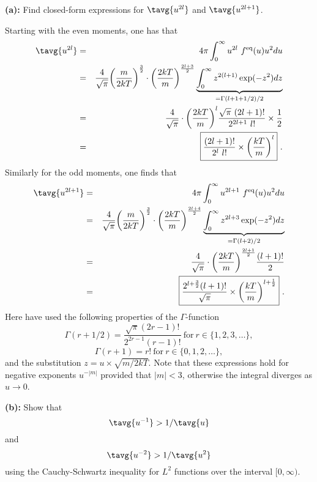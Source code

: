 
\textbf{(a):} Find closed-form expressions for $\tavg{u^{2 l}}$ and $\tavg{u^{2 l+1}}$.

Starting with the even moments, one has that
\begin{eqnarray}
\tavg{u^{2 l} } &=& 4 \pi \int^{\infty}_{0} u^{2 l} ~f^{\text{eq}}(u) u^2 du \nonumber \\
&=& \frac{4}{\sqrt{\pi}} \bigg(\frac{m}{2 k T}\bigg)^{\frac{3}{2}} \cdot \bigg(\frac{2 k T}{m}\bigg)^{\frac{2l+3}{2}} \underbrace{\int^{\infty}_{0} z^{2(l+1)} \exp(-z^2) dz}_{=\Gamma(l+1+1/2)/2} \nonumber \\
&=& \frac{4}{\sqrt{\pi}} \cdot \bigg(\frac{2 k T}{m}\bigg)^l \frac{\sqrt{\pi} ~(2l+1)!}{2^{2l+1} ~ l!} \times \frac{1}{2} \nonumber \\
&=& \boxed{\frac{(2l+1)!}{2^{l} ~ l!} \times \bigg(\frac{k T}{m}\bigg)^l}~.
\end{eqnarray}
Similarly for the odd moments, one finds that
\begin{eqnarray}
\tavg{u^{2 l+1} } &=& 4 \pi \int^{\infty}_{0} u^{2 l+1} ~f^{\text{eq}}(u) u^2 du \nonumber \\
&=& \frac{4}{\sqrt{\pi}} \bigg(\frac{m}{2 k T}\bigg)^{\frac{3}{2}} \cdot \bigg(\frac{2 k T}{m}\bigg)^{\frac{2l+4}{2}} \underbrace{\int^{\infty}_{0} z^{2l+3} \exp(-z^2) dz}_{=\Gamma(l+2)/2} \nonumber \\
&=& \frac{4}{\sqrt{\pi}} \cdot \bigg(\frac{2 k T}{m}\bigg)^{\frac{2l+1}{2}} \frac{(l+1)!}{2} \nonumber \\
&=&  \boxed{\frac{2^{l+\frac{3}{2}} (l+1)!}{\sqrt{\pi}} \times \bigg(\frac{k T}{m}\bigg)^{l+\frac{1}{2}}}~. 
\end{eqnarray}
Here have used the following properties of the $\Gamma$-function
\begin{equation}
\Gamma(r+1/2) = \frac{\sqrt{\pi} (2r-1)!}{2^{2r-1} (r-1)!}~\text{for}~r\in\{1, 2, 3, \dots\},
\end{equation}
\begin{equation}
\Gamma(r+1) = r!~\text{for}~r\in\{0, 1, 2, \dots\},
\end{equation}
and the substitution $z = u \times \sqrt{m/2 k T}$.
Note that these expressions hold for negative exponents $u^{-|m|}$ provided that $|m|<3$, otherwise the integral diverges as $u\rightarrow0$.

\textbf{(b):} Show that
\begin{equation}
\tavg{u^{-1}} > 1/\tavg{u} \nonumber
\end{equation}
and 
\begin{equation}
\tavg{u^{-2}} > 1/\tavg{u^2} \nonumber
\end{equation}
using the Cauchy-Schwartz inequality for $L^2$ functions over the interval $[0, \infty)$.


